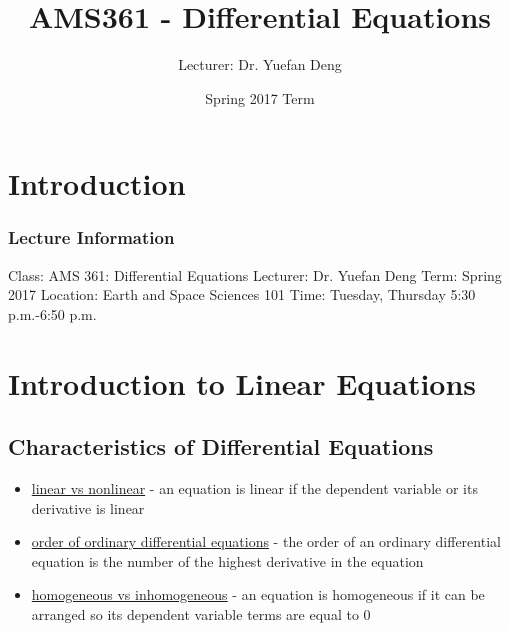 \documentclass[12 pt, oneside]{book}
\begin{document}
\newenvironment{mathline}{\begin{adjustwidth}{2cm}{}\begin{linenumbers*}}{\end{linenumbers*}\end{adjustwidth}}
\newcommand{\laplace}{$\mathcal{L}$}

\frontmatter

\title{AMS361 - Differential Equations}
\author{Lecturer: Dr. Yuefan Deng}
\date{Spring 2017 Term}

\maketitle

\tableofcontents

\chapter{Introduction}

\subsection{Lecture Information}
Class: AMS 361: Differential Equations\newline
Lecturer: Dr. Yuefan Deng\newline
Term: Spring 2017\newline
Location: Earth and Space Sciences 101\newline
Time: Tuesday, Thursday 5:30 p.m.-6:50 p.m.\newline


\mainmatter

\chapter{Introduction to Linear Equations}
\section{Characteristics of Differential Equations}
\begin{itemize}
\item \underline{linear vs nonlinear} - an equation is linear if the dependent variable or its derivative is linear
\item \underline{order of ordinary differential equations} - the order of an ordinary differential equation is the number of the highest derivative in the equation
\item \underline{homogeneous vs inhomogeneous} - an equation is homogeneous if it can be arranged so its dependent variable terms are equal to 0
\end{itemize}
\end{document}
